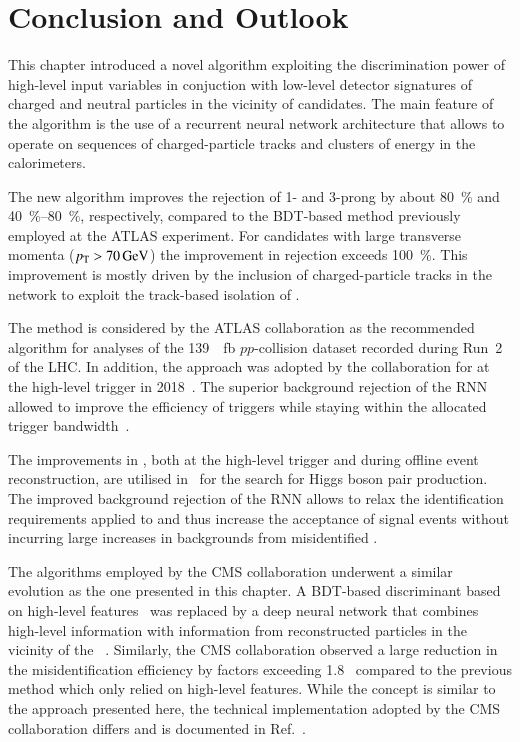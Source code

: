 \section{Conclusion and Outlook}%
\label{sec:tauid_conclusion}

This chapter introduced a novel \tauid algorithm exploiting the
discrimination power of high-level input variables in conjuction with
low-level detector signatures of charged and neutral particles in the
vicinity of \tauhadvis candidates. The main feature of the algorithm
is the use of a recurrent neural network architecture that allows to
operate on sequences of charged-particle tracks and clusters of energy
in the calorimeters.

The new algorithm improves the rejection of 1- and 3-prong
\faketauhadvis by about \SI{80}{\percent} and
\SIrange{40}{80}{\percent}, respectively, compared to the BDT-based
method previously employed at the ATLAS experiment. For \tauhadvis
candidates with large transverse momenta ($\pT > \SI{70}{\GeV}$) the
improvement in \faketauhadvis rejection exceeds
\SI{100}{\percent}. This improvement is mostly driven by the inclusion
of charged-particle tracks in the network to exploit the track-based
isolation of \tauhadvis.

The method is considered by the ATLAS collaboration as the recommended
\tauid algorithm for analyses of the \SI{139}{\per\femto\barn}
$pp$-collision dataset recorded during Run~2 of the LHC. In addition,
the approach was adopted by the collaboration for \tauid at the
high-level trigger in 2018~\cite{ATL-DAQ-PUB-2019-001}. The superior
background rejection of the RNN \tauid allowed to improve the
efficiency of \tauhadvis triggers while staying within the allocated
trigger bandwidth~\cite{ATL-DAQ-PUB-2019-001}.

The improvements in \tauid, both at the high-level trigger and during
offline event reconstruction, are utilised in~ for
the search for Higgs boson pair production. The improved background
rejection of the RNN allows to relax the identification requirements
applied to \tauhadvis and thus increase the acceptance of signal
events without incurring large increases in backgrounds from
misidentified \tauhadvis.

The \tauid algorithms employed by the CMS collaboration underwent a
similar evolution as the one presented in this chapter. A BDT-based
discriminant based on high-level features~\cite{CMS-TAU-16-003} was
replaced by a deep neural network that combines high-level information
with information from reconstructed particles in the vicinity of the
\tauhadvis~\cite{CMS-TAU-20-001}. Similarly, the CMS collaboration
observed a large reduction in the \faketauhadvis misidentification
efficiency by factors exceeding 1.8~\cite{CMS-TAU-20-001} compared to
the previous method which only relied on high-level features. While
the concept is similar to the approach presented here, the technical
implementation adopted by the CMS collaboration differs and is
documented in Ref.~\cite{CMS-TAU-20-001}.

